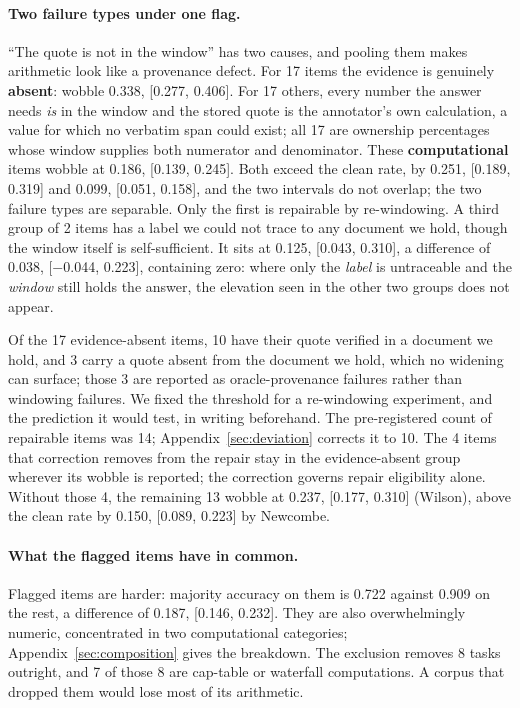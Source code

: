 \documentclass[11pt]{article}
\begin{document}
\paragraph{Two failure types under one flag.} ``The quote is not in the window'' has two causes, and
pooling them makes arithmetic look like a provenance defect. For 17 items the evidence is
genuinely \textbf{absent}: wobble 0.338, [0.277, 0.406]. For 17 others, every number the answer
needs \emph{is} in the window and the stored quote is the annotator's own calculation, a value for
which no verbatim span could exist; all 17 are ownership percentages whose window supplies both
numerator and denominator. These \textbf{computational} items wobble at 0.186, [0.139, 0.245]. Both exceed
the clean rate, by 0.251, [0.189, 0.319] and 0.099, [0.051, 0.158], and the two intervals do not
overlap; the two failure types are separable. Only the first is repairable by re-windowing. A
third group of 2 items has a label we could not trace to any document we hold, though the window
itself is self-sufficient. It sits at 0.125, [0.043, 0.310], a difference of 0.038, [$-$0.044,
0.223], containing zero: where only the \emph{label} is untraceable and the \emph{window} still
holds the answer, the elevation seen in the other two groups does not appear.

Of the 17 evidence-absent items, 10 have their quote verified in a document we hold, and 3 carry a
quote absent from the document we hold, which no widening can surface; those 3 are reported as
oracle-provenance failures rather than windowing failures. We fixed the threshold for a
re-windowing experiment, and the prediction it would test, in writing beforehand. The
pre-registered count of repairable items was 14; Appendix~\ref{sec:deviation} corrects it to 10.
The 4 items that correction removes from the repair stay in the evidence-absent group wherever its
wobble is reported; the correction governs repair eligibility alone. Without those 4, the
remaining 13 wobble at 0.237, [0.177, 0.310] (Wilson), above the clean rate by 0.150, [0.089, 0.223] by Newcombe.

\paragraph{What the flagged items have in common.} Flagged items are harder: majority accuracy on
them is 0.722 against 0.909 on the rest, a difference of 0.187, [0.146, 0.232]. They are also
overwhelmingly numeric, concentrated in two computational categories;
Appendix~\ref{sec:composition} gives the breakdown. The exclusion removes 8 tasks outright, and 7
of those 8 are cap-table or waterfall computations. A corpus that dropped them would lose most
of its arithmetic.
\end{document}
